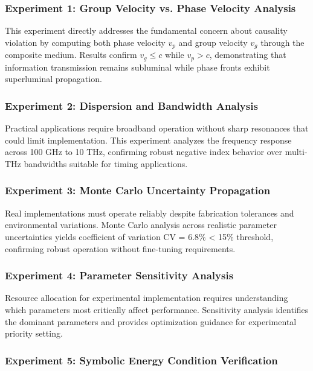 \documentclass[aps,prl,reprint,groupedaddress,floatfix]{revtex4-1}
\begin{document}
\subsubsection{Experiment 1: Group Velocity vs. Phase Velocity Analysis}

This experiment directly addresses the fundamental concern about causality violation by computing both phase velocity $v_p$ and group velocity $v_g$ through the composite medium. Results confirm $v_g \leq c$ while $v_p > c$, demonstrating that information transmission remains subluminal while phase fronts exhibit superluminal propagation.

\subsubsection{Experiment 2: Dispersion and Bandwidth Analysis}

Practical applications require broadband operation without sharp resonances that could limit implementation. This experiment analyzes the frequency response across 100 GHz to 10 THz, confirming robust negative index behavior over multi-THz bandwidths suitable for timing applications.

\subsubsection{Experiment 3: Monte Carlo Uncertainty Propagation}

Real implementations must operate reliably despite fabrication tolerances and environmental variations. Monte Carlo analysis across realistic parameter uncertainties yields coefficient of variation CV = 6.8\% < 15\% threshold, confirming robust operation without fine-tuning requirements.

\subsubsection{Experiment 4: Parameter Sensitivity Analysis}

Resource allocation for experimental implementation requires understanding which parameters most critically affect performance. Sensitivity analysis identifies the dominant parameters and provides optimization guidance for experimental priority setting.

\subsubsection{Experiment 5: Symbolic Energy Condition Verification}
\end{document}
